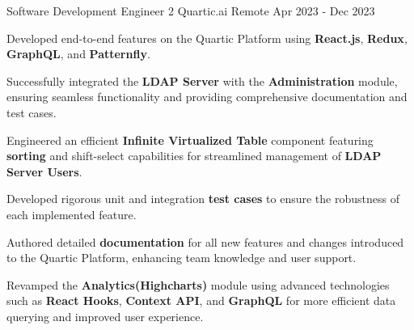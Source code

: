 \begin{cventries}
  \cventry
    {Software Development Engineer 2}
    {Quartic.ai}
    {Remote}
    {Apr 2023 - Dec 2023}
    {
      \begin{cvitems}
        \item {Developed end-to-end features on the Quartic Platform using \textbf{React.js}, \textbf{Redux}, \textbf{GraphQL}, and \textbf{Patternfly}.}
        \item {Successfully integrated the \textbf{LDAP Server} with the \textbf{Administration} module, ensuring seamless functionality and providing comprehensive documentation and test cases.}
        \item {Engineered an efficient \textbf{Infinite Virtualized Table} component featuring \textbf{sorting} and shift-select capabilities for streamlined management of \textbf{LDAP Server Users}.}
        \item {Developed rigorous unit and integration \textbf{test cases} to ensure the robustness of each implemented feature.}
        \item {Authored detailed \textbf{documentation} for all new features and changes introduced to the Quartic Platform, enhancing team knowledge and user support.}
        \item {Revamped the \textbf{Analytics(Highcharts)} module using advanced technologies such as \textbf{React Hooks}, \textbf{Context API}, and \textbf{GraphQL} for more efficient data querying and improved user experience.}
      \end{cvitems}
    }


\end{cventries}
